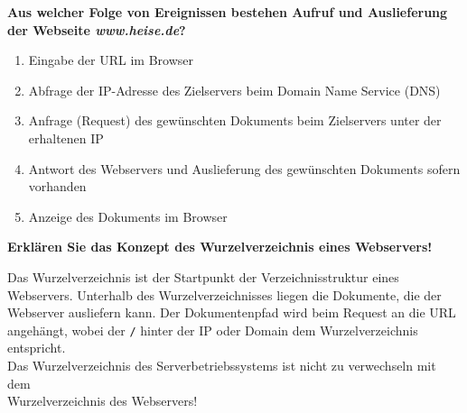 \documentclass[ngerman,addpoints,10pt]{exam}
\begin{document}
\begin{questions}
		\newpage

				
		\question[10]
		\textbf{Aus welcher Folge von Ereignissen bestehen Aufruf und Auslieferung der Webseite \textit{www.heise.de}?}
		\droppoints
		\begin{solutionorbox}[6cm]
			\begin{enumerate}
			\item Eingabe der URL im Browser
			\item Abfrage der IP-Adresse des Zielservers beim Domain Name Service (DNS)
			\item Anfrage (Request) des gewünschten Dokuments beim Zielservers unter der erhaltenen IP
			\item Antwort des Webservers und Auslieferung des gewünschten Dokuments sofern vorhanden
			\item Anzeige des Dokuments im Browser
			\end{enumerate}
		\end{solutionorbox}
		\bigskip
		
		
		\question[10]
		\textbf{Erklären Sie das Konzept des Wurzelverzeichnis eines Webservers!}
		\droppoints
		\begin{solutionorbox}[6cm]
			Das Wurzelverzeichnis ist der Startpunkt der Verzeichnisstruktur eines Webservers. 
			Unterhalb des Wurzelverzeichnisses liegen die Dokumente, die der Webserver ausliefern kann. 
			Der Dokumentenpfad wird beim Request an die URL angehängt, wobei der \texttt{/} hinter der IP 
			oder Domain dem Wurzelverzeichnis entspricht.\\
			Das Wurzelverzeichnis des Serverbetriebssystems ist nicht zu verwechseln mit dem \\
			Wurzelverzeichnis
			des Webservers!
		\end{solutionorbox}
		\bigskip

	\end{questions}



	\fullwidth{\gradetable[h]}

	\bigskip
	\bigskip

	

	
\end{document}

